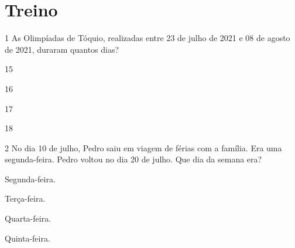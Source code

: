 






\pagebreak
\section*{Treino}

\num{1} As Olimpíadas de Tóquio, realizadas entre 23 de julho de 2021 e 08 de
agosto de 2021, duraram quantos dias?

\begin{escolha}[itemsep=-5pt]
\item 15

\item 16

\item 17

\item 18
\end{escolha}

\num{2} No dia 10 de julho, Pedro saiu em viagem de férias com a família. Era
uma segunda-feira. Pedro voltou no dia 20 de julho. Que dia da semana
era?

\begin{escolha}[itemsep=-5pt]
\item Segunda-feira.

\item Terça-feira.

\item Quarta-feira.

\item Quinta-feira.
\end{escolha}

